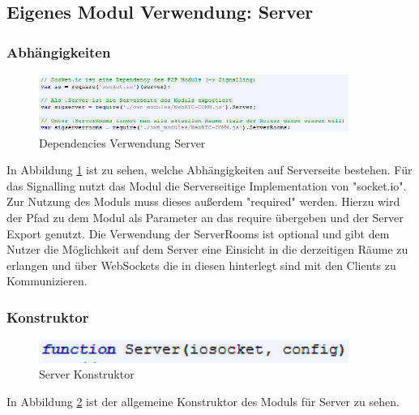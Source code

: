 \subsection{Eigenes Modul Verwendung: Server}
\subsubsection{Abhängigkeiten}
\begin{figure}[htH]
\centering
\includegraphics[width=0.9\textwidth]{backend/Modul_UserServerDependencies.PNG}
\caption{Dependencies Verwendung Server}
\label{backfig6}
\end{figure}
In Abbildung \ref{backfig6} ist zu sehen, welche Abhängigkeiten auf Serverseite bestehen.
Für das Signalling nutzt das Modul die Serverseitige Implementation von "socket.io". 
Zur Nutzung des Moduls muss dieses außerdem "required" werden. Hierzu wird der Pfad zu dem Modul als Parameter an das require übergeben und der Server Export genutzt.
Die Verwendung der ServerRooms ist optional und gibt dem Nutzer die Möglichkeit auf dem Server eine Einsicht in die derzeitigen Räume zu erlangen und über WebSockets die in diesen hinterlegt sind mit den Clients zu Kommunizieren.



\subsubsection{Konstruktor}
\begin{figure}[htH]
\centering
\includegraphics[width=0.9\textwidth]{backend/Modul_ServerContructor.PNG}
\caption{Server Konstruktor}
\label{backfig7}
\end{figure}
In Abbildung \ref{backfig7} ist der allgemeine Konstruktor des Moduls für Server zu sehen.



